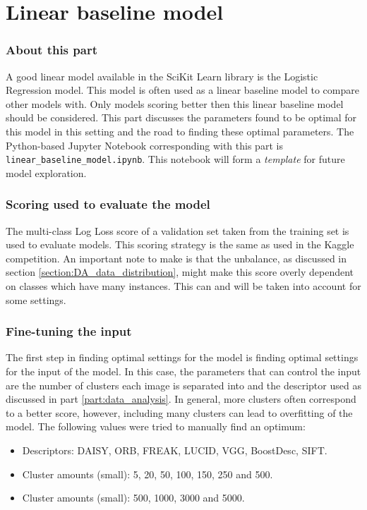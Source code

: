 \part{Linear baseline model}
\label{part:linear_baseline}


\section{About this part}
\label{section:LBM_about_part}
A good linear model available in the SciKit Learn library is the Logistic Regression model.
This model is often used as a linear baseline model to compare other models with.
Only models scoring better then this linear baseline model should be considered.
This part discusses the parameters found to be optimal for this model in this setting and the road to finding these optimal parameters.
The Python-based Jupyter Notebook corresponding with this part is \texttt{linear\_baseline\_model.ipynb}.
This notebook will form a \emph{template} for future model exploration.

\section{Scoring used to evaluate the model}
\label{section:LBM_scoring_used}

The multi-class Log Loss score of a validation set taken from the training set is used to evaluate models.
This scoring strategy is the same as used in the Kaggle competition.
An important note to make is that the unbalance, as discussed in section \ref{section:DA_data_distribution}, might make this score overly dependent on classes which have many instances.
This can and will be taken into account for some settings.



\section{Fine-tuning the input}
\label{section:LBM_finetuning_clusters}
The first step in finding optimal settings for the model is finding optimal settings for the input of the model.
In this case, the parameters that can control the input are the number of clusters each image is separated into and the descriptor used as discussed in part \ref{part:data_analysis}.
In general, more clusters often correspond to a better score, however, including many clusters can lead to overfitting of the model.
The following values were tried to manually find an optimum:
\begin{itemize}
    \item Descriptors: DAISY, ORB, FREAK, LUCID, VGG, BoostDesc, SIFT.
    \item Cluster amounts (small): 5, 20, 50, 100, 150, 250 and 500.
    \item Cluster amounts (small): 500, 1000, 3000 and 5000.
\end{itemize}

